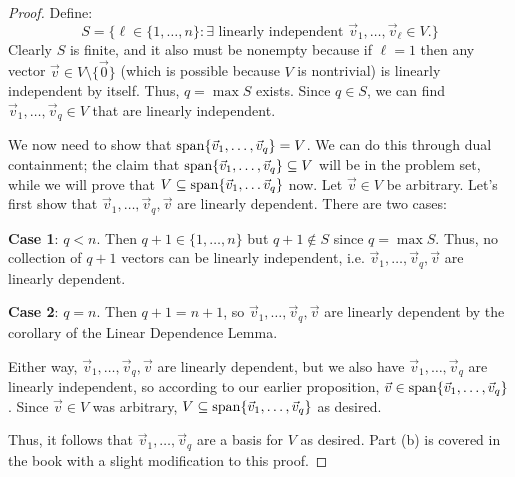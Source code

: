 \documentclass[main.tex]{subfiles}
\begin{document}
\begin{proof}
    Define:
    \[S = \{\ell \in \{1, \ldots , n\} : \exists \text{ linearly independent } \vec{v}_1, \ldots , \vec{v}_\ell\in V.\}\]
    Clearly $S$ is finite, and it also must be nonempty because if $\ell = 1$ then any vector $\vec{v}\in V\setminus \{\vec{0}\}$ (which is possible because $V$ is nontrivial) is linearly independent by itself. Thus, $q = \max S$ exists. Since $q\in S$, we can find $\vec{v}_1, \ldots , \vec{v}_q \in V$ that are linearly independent. 
    
    We now need to show that $\operatorname{span}\{\vec{v}_1, \ldots , \vec{v}_q\} = V$. We can do this through dual containment; the claim that $\operatorname{span}\{\vec{v}_1, \ldots , \vec{v}_q\}\subseteq V$ will be in the problem set, while we will prove that $V\subseteq \operatorname{span}\{\vec{v}_1, \ldots \vec{v}_q\}$ now. Let $\vec{v}\in V$ be arbitrary. Let's first show that $\vec{v}_1, \ldots , \vec{v}_q, \vec{v}$ are linearly dependent. There are two cases:

    \textbf{Case 1}: $q < n$. Then $q + 1\in \{ 1, \ldots , n\}$ but $q + 1 \not\in S$ since $q = \max S$. Thus, no collection of $q + 1$ vectors can be linearly independent, i.e. $\vec{v}_1 , \ldots , \vec{v}_q, \vec{v}$ are linearly dependent.

    \textbf{Case 2}: $q = n$. Then $q + 1 = n + 1$, so $\vec{v}_1, \ldots , \vec{v}_q, \vec{v}$ are linearly dependent by the corollary of the Linear Dependence Lemma.

    Either way, $\vec{v}_1, \ldots , \vec{v}_q, \vec{v}$ are linearly dependent, but we also have $\vec{v}_1, \ldots , \vec{v}_q$ are linearly independent, so according to our earlier proposition, $\vec{v}\in \operatorname{span} \{ \vec{v}_1, \ldots , \vec{v}_q\}$. Since $\vec{v} \in V$ was arbitrary, $V\subseteq \operatorname{span} \{\vec{v}_1, \ldots , \vec{v}_q\}$ as desired.

    Thus, it follows that $\vec{v}_1, \ldots , \vec{v}_q$ are a basis for $V$ as desired. Part (b) is covered in the book with a slight modification to this proof.
\end{proof}
\end{document}
